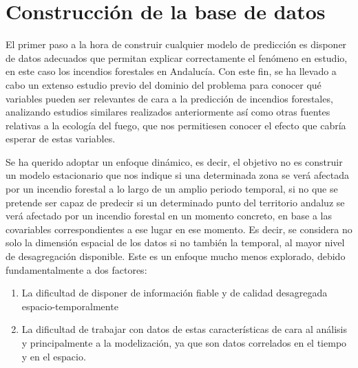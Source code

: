 \documentclass[12pt,a4paper,]{book}
\title{}
\author{Nombre Completo Autor}
\date{18/11/2021}
\def\ifdoblecara{} %
\def\ifprincipal{} %
\let\ifprincipal\undefined %
\providecommand{\tightlist}{%
  \setlength{\itemsep}{0pt}\setlength{\parskip}{0pt}}
\numberwithin{dummy}{section}
\theoremstyle{ocrenumbox}
\theoremstyle{blacknumex}
\theoremstyle{blacknumbox}
\theoremstyle{ocrenum}
\theoremstyle{ocrenum}
\begin{document}




\raggedbottom

\ifdefined\ifprincipal
\else
\setlength{\parindent}{1em}
\pagestyle{fancy}
\setcounter{tocdepth}{4}
\tableofcontents

\fi

\ifdefined\ifdoblecara
\fancyhead{}{}
\fancyhead[LE,RO]{\scriptsize\rightmark}
\fancyfoot[LO,RE]{\scriptsize\slshape \leftmark}
\fancyfoot[C]{}
\fancyfoot[LE,RO]{\footnotesize\thepage}
\else
\fancyhead{}{}
\fancyhead[RO]{\scriptsize\rightmark}
\fancyfoot[LO]{\scriptsize\slshape \leftmark}
\fancyfoot[C]{}
\fancyfoot[RO]{\footnotesize\thepage}
\fi

\renewcommand{\headrulewidth}{0.4pt}
\renewcommand{\footrulewidth}{0.4pt}

\hypertarget{construcciuxf3n-de-la-base-de-datos}{%
\chapter{Construcción de la base de
datos}\label{construcciuxf3n-de-la-base-de-datos}}

El primer paso a la hora de construir cualquier modelo de predicción es
disponer de datos adecuados que permitan explicar correctamente el
fenómeno en estudio, en este caso los incendios forestales en Andalucía.
Con este fin, se ha llevado a cabo un extenso estudio previo del dominio
del problema para conocer qué variables pueden ser relevantes de cara a
la predicción de incendios forestales, analizando estudios similares
realizados anteriormente así como otras fuentes relativas a la ecología
del fuego, que nos permitiesen conocer el efecto que cabría esperar de
estas variables.

Se ha querido adoptar un enfoque dinámico, es decir, el objetivo no es
construir un modelo estacionario que nos indique si una determinada zona
se verá afectada por un incendio forestal a lo largo de un amplio
periodo temporal, si no que se pretende ser capaz de predecir si un
determinado punto del territorio andaluz se verá afectado por un
incendio forestal en un momento concreto, en base a las covariables
correspondientes a ese lugar en ese momento. Es decir, se considera no
solo la dimensión espacial de los datos si no también la temporal, al
mayor nivel de desagregación disponible. Este es un enfoque mucho menos
explorado, debido fundamentalmente a dos factores:

\begin{enumerate}
\def\labelenumi{\arabic{enumi}.}
\tightlist
\item
  La dificultad de disponer de información fiable y de calidad
  desagregada espacio-temporalmente
\item
  La dificultad de trabajar con datos de estas características de cara
  al análisis y principalmente a la modelización, ya que son datos
  correlados en el tiempo y en el espacio.
\end{enumerate}
\end{document}
